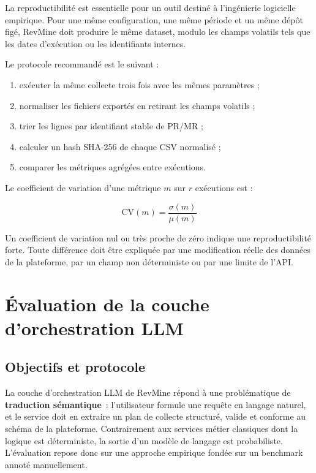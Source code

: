 La reproductibilité est essentielle pour un outil destiné à l'ingénierie logicielle empirique. Pour une même configuration, une même période et un même dépôt figé, RevMine doit produire le même dataset, modulo les champs volatils tels que les dates d'exécution ou les identifiants internes.

Le protocole recommandé est le suivant :

\begin{enumerate}
    \item exécuter la même collecte trois fois avec les mêmes paramètres ;
    \item normaliser les fichiers exportés en retirant les champs volatils ;
    \item trier les lignes par identifiant stable de PR/MR ;
    \item calculer un hash SHA-256 de chaque CSV normalisé ;
    \item comparer les métriques agrégées entre exécutions.
\end{enumerate}

Le coefficient de variation d'une métrique $m$ sur $r$ exécutions est :

\begin{equation}
\mathrm{CV}(m) = \frac{\sigma(m)}{\mu(m)}
\end{equation}

Un coefficient de variation nul ou très proche de zéro indique une reproductibilité forte. Toute différence doit être expliquée par une modification réelle des données de la plateforme, par un champ non déterministe ou par une limite de l'API.

\section{Évaluation de la couche d'orchestration LLM}
\label{sec:eval-llm}

\subsection{Objectifs et protocole}

La couche d'orchestration LLM de RevMine répond à une problématique de \textbf{traduction
sémantique}~: l'utilisateur formule une requête en langage naturel, et le service doit en extraire
un plan de collecte structuré, valide et conforme au schéma de la plateforme. Contrairement aux
services métier classiques dont la logique est déterministe, la sortie d'un modèle de langage est
probabiliste. L'évaluation repose donc sur une approche empirique fondée sur un benchmark annoté
manuellement.

